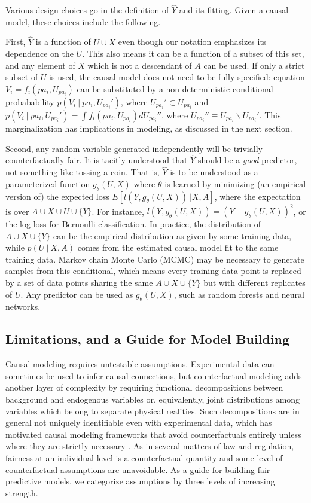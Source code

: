
Various design choices go in the definition of $\hat Y$ and its fitting. Given a causal model, these choices include the following.

First, $\hat Y$ is a function of $U \cup X$ even though our notation emphasizes its dependence on the $U$. This also means it can be a function of a subset of this set, and any element of $X$ which is not a descendant of $A$ can be used. If only a strict subset of $U$ is used, the causal model does not need to be fully specified: equation $V_i = f_i(pa_i, U_{pa_i})$ can be substituted by a non-deterministic conditional probabability $p(V_i\ |\ pa_i, U_{pa_i}')$, where $U_{pa_i}' \subset U_{pa_i}$ and $p(V_i\ |\ pa_i, U_{pa_i}') = \int f_i(pa_i, U_{pa_i}) d U_{pa_i}''$, where $U_{pa_i}'' \equiv U_{pa_i} \backslash U_{pa_i}'$. This marginalization has implications in modeling, as discussed in the next section.

Second, any random variable generated independently will be trivially counterfactually fair. It is tacitly understood that $\hat Y$ should be a {\it good} predictor, not something like tossing a coin. That is, $\hat Y$ is to be understood as a parameterized function $g_\theta(U, X)$ where $\theta$ is learned by minimizing (an empirical version of) the expected loss $E[l(Y, g_\theta(U, X))\ | X,
  A]$, where the expectation is over $A \cup X \cup U \cup \{Y\}$. For instance, $l(Y, g_\theta(U, X)) = (Y - g_\theta(U, X))^2$, or the log-loss for Bernoulli classification.  In practice, the distribution of $A \cup X \cup \{Y\}$ can be the empirical distribution as given by some training data, while $p(U\ |\ X, A)$ comes from the estimated causal model fit to the same training data. Markov chain Monte Carlo (MCMC) may be necessary to generate samples from this conditional, which means every training data point is replaced by a set of data points sharing the same $A \cup X \cup \{Y\}$ but with different replicates of $U$. Any predictor can be used as $g_\theta(U, X)$, such as random forests and neural networks.

\subsection{Limitations, and a Guide for Model Building}

Causal modeling requires untestable assumptions. Experimental data can sometimes be used to infer causal connections, but counterfactual modeling adds another layer of complexity by requiring functional decompositions between background and endogenous variables or, equivalently, joint distributions among variables which belong to separate physical realities. Such decompositions are in general not uniquely identifiable even with experimental data, which has motivated causal modeling frameworks that avoid counterfactuals entirely unless where they are strictly necessary \citep{dawid:00}. As in several matters of law and regulation, fairness at an individual level is a counterfactual quantity and some level of counterfactual assumptions are unavoidable. As a guide for building fair predictive models, we categorize assumptions by three levels of increasing strength.

